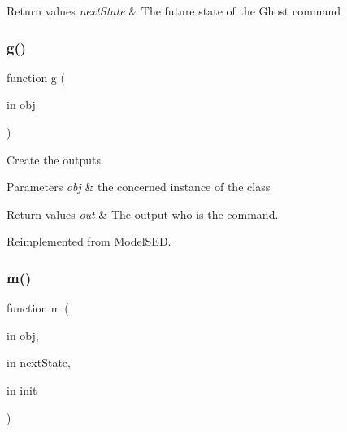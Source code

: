 \begin{DoxyRetVals}{Return values}
{\em next\+State} & The future state of the Ghost command \\
\hline
\end{DoxyRetVals}
\mbox{\label{class_model_ghost_a07dadfabe92bf9a144b8a862720e7746}} 
\subsubsection{\texorpdfstring{g()}{g()}}
{\footnotesize\ttfamily function g (\begin{DoxyParamCaption}\item[{in}]{obj }\end{DoxyParamCaption})\hspace{0.3cm}{\ttfamily [virtual]}}



Create the outputs. 


\begin{DoxyParams}{Parameters}
{\em obj} & the concerned instance of the class \\
\hline
\end{DoxyParams}

\begin{DoxyRetVals}{Return values}
{\em out} & The output who is the command. \\
\hline
\end{DoxyRetVals}


Reimplemented from \hyperlink{class_model_s_e_d_ac6bf71081e35755d5ed9992d165afcb8}{Model\+S\+ED}.

\mbox{\label{class_model_ghost_a3140f24c6c4b80037b7d4f521c6ae2d3}} 
\subsubsection{\texorpdfstring{m()}{m()}}
{\footnotesize\ttfamily function m (\begin{DoxyParamCaption}\item[{in}]{obj,  }\item[{in}]{next\+State,  }\item[{in}]{init }\end{DoxyParamCaption})\hspace{0.3cm}{\ttfamily [virtual]}}



